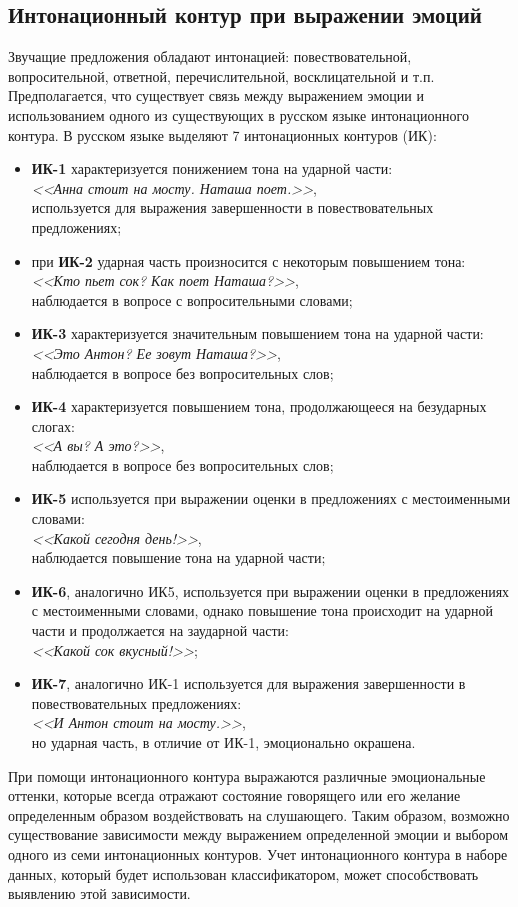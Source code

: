 \subsection{Интонационный контур при выражении эмоций}
Звучащие предложения обладают интонацией: повествовательной, вопросительной, ответной, перечислительной, восклицательной и т.п. Предполагается, что существует связь между выражением эмоции и использованием одного из существующих в русском языке интонационного контура. \cite{intonation} В русском языке выделяют 7 интонационных контуров (ИК): \cite{ik}
\begin{itemize}
	\item \textbf{ИК-1} характеризуется понижением тона на ударной части:\\
	\textit{<<Анна стоит на мосту. Наташа поет.>>},\\
	используется для выражения завершенности в повествовательных предложениях;
	\item при \textbf{ИК-2} ударная часть произносится с некоторым повышением тона:\\
	\textit{<<Кто пьет сок? Как поет Наташа?>>},\\
	наблюдается в вопросе с вопросительными словами;
	\item \textbf{ИК-3} характеризуется значительным повышением тона на ударной части:\\
	\textit{<<Это Антон? Ее зовут Наташа?>>},\\
	наблюдается в вопросе без вопросительных слов;
	\item \textbf{ИК-4} характеризуется повышением тона, продолжающееся на безударных слогах:\\
	\textit{<<А вы? А это?>>},\\
	наблюдается в вопросе без вопросительных слов;
	\item \textbf{ИК-5} используется при выражении оценки в предложениях с местоименными словами:\\
	\textit{<<Какой сегодня день!>>},\\
	наблюдается повышение тона на ударной части;
	\item \textbf{ИК-6}, аналогично ИК5, используется при выражении оценки в предложениях с местоименными словами, однако повышение тона происходит на ударной части и продолжается на заударной части:\\
	\textit{<<Какой сок вкусный!>>};
	\item \textbf{ИК-7}, аналогично ИК-1 используется для выражения завершенности в повествовательных предложениях:\\
	\textit{<<И Антон стоит на мосту.>>},\\
	но ударная часть, в отличие от ИК-1, эмоционально окрашена.
\end{itemize}
При помощи интонационного контура выражаются различные эмоциональные оттенки, которые всегда отражают состояние говорящего или его желание определенным образом воздействовать на слушающего. Таким образом, возможно существование зависимости между выражением определенной эмоции и выбором одного из семи интонационных контуров. Учет интонационного контура в наборе данных, который будет использован классификатором, может способствовать выявлению этой зависимости.

